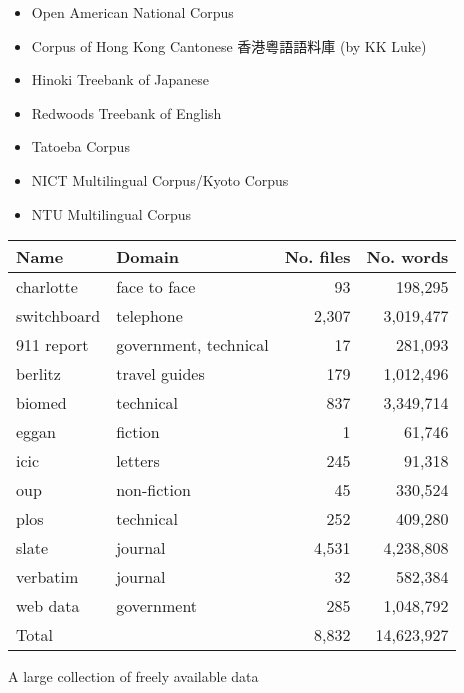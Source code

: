\documentclass[a4paper,landscape,headrule,footrule,xetex]{foils}
\begin{document}

\begin{itemize}
\item Open American National Corpus
\item Corpus of Hong Kong Cantonese 香港粵語語料庫 (by KK Luke)
\item Hinoki Treebank of Japanese
\item Redwoods Treebank of English
\item Tatoeba Corpus
\item NICT Multilingual Corpus/Kyoto Corpus
\item NTU Multilingual Corpus
\end{itemize}


\begin{tabular}{llrr}
Name & Domain & No. files & No. words \\
\hline
charlotte & 	face to face 	& 93 &198,295 \\
switchboard & 	telephone	& 2,307 &3,019,477 \\
\hline
911  report & 	government, technical 	& 17  &	 281,093 \\
berlitz & 	travel guides 	& 179 &1,012,496 \\
biomed & 	technical	& 837 &3,349,714 \\
eggan & 	fiction 	& 1 &61,746 \\
icic & 	letters	& 245 &91,318 \\
oup & 	non-fiction	& 45 &330,524 \\
plos & 	technical	& 252 &409,280 \\
slate & 	journal	& 4,531 &4,238,808 \\
verbatim & 	journal	& 32 &582,384 \\
web  data &	government	& 285 &1,048,792 \\
\hline
Total& & 8,832 & 	14,623,927\\
\end{tabular}

A large collection of freely available data

\end{document}
